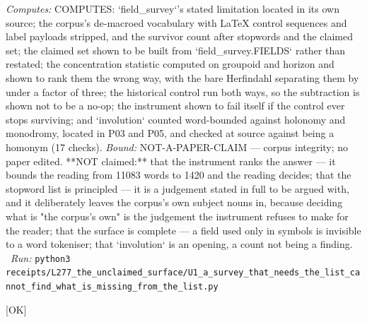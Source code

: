 \begin{description}
\emph{Computes:} COMPUTES: `field\_survey`'s stated limitation located in its own source; the corpus's de-macroed vocabulary with LaTeX control sequences and label payloads stripped, and the survivor count after stopwords and the claimed set; the claimed set shown to be built from `field\_survey.FIELDS` rather than restated; the concentration statistic computed on groupoid and horizon and shown to rank them the wrong way, with the bare Herfindahl separating them by under a factor of three; the historical control run both ways, so the subtraction is shown not to be a no-op; the instrument shown to fail itself if the control ever stops surviving; and `involution` counted word-bounded against holonomy and monodromy, located in P03 and P05, and checked at source against being a homonym (17 checks).
 \emph{Bound:} NOT-A-PAPER-CLAIM --- corpus integrity; no paper edited. **NOT claimed:** that the instrument ranks the answer --- it bounds the reading from 11083 words to 1420 and the reading decides; that the stopword list is principled --- it is a judgement stated in full to be argued with, and it deliberately leaves the corpus's own subject nouns in, because deciding what is "the corpus's own" is the judgement the instrument refuses to make for the reader; that the surface is complete --- a field used only in symbols is invisible to a word tokeniser; that `involution` is an opening, a count not being a finding.
\ \emph{Run:} \texttt{python3 receipts/L277\_the\_unclaimed\_surface/U1\_a\_survey\_that\_needs\_the\_list\_cannot\_find\_what\_is\_missing\_from\_the\_list.py}
\item[\label{rcpt:I1_so6C_has_five_real_forms_and_the_omitted_one_admits_su3}\texttt{I1\_so6C\_has\_five\_real\_forms\_and\_the\_omitted\_one\_admits\_su3}]\hfill\textsf{[OK]}\\

\end{description}
